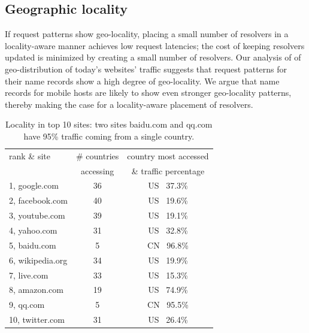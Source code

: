 \subsection{Geographic locality}

If request patterns show geo-locality, placing a small number of resolvers in a locality-aware manner achieves low request latencies; the cost of keeping resolvers updated is minimized by creating a small number of resolvers. Our analysis of of geo-distribution of today's websites' traffic suggests that request patterns for their name records  show a high degree of geo-locality. We argue that name records for mobile hosts are likely to show even stronger geo-locality patterns, thereby making the case for a locality-aware placement of resolvers.

 
\begin{table}[t]
\centering
\begin{tabular}{ l | c | c}
\hline
rank \& site & \# countries & country most accessed\\
  & accessing  & \& traffic percentage\\
\hline
\hline
1, google.com & 36 & US \ 37.3\% \\ 
\hline
2, facebook.com & 40 & US \ 19.6\% \\
\hline
3, youtube.com & 39 & US \ 19.1\% \\
\hline
4, yahoo.com & 31 & US \ 32.8\% \\
\hline
\rowcolor[gray]{0.9} 5, baidu.com & 5 & CN \ 96.8\% \\
\hline
6, wikipedia.org & 34 & US \ 19.9\% \\
\hline
7, live.com & 33 & US \ 15.3\%\\
\hline
\rowcolor[gray]{0.9} 8, amazon.com & 19 & US \ 74.9\%\\
\hline
\rowcolor[gray]{0.9} 9, qq.com & 5 & CN \ 95.5\%\\
\hline
10, twitter.com & 31 & US \ 26.4\%\\
 \hline
\end{tabular}
\caption{Locality in top 10 sites: two sites baidu.com and qq.com have 95\% traffic coming from a single country.}
\label{tab:top10web}
\end{table}

